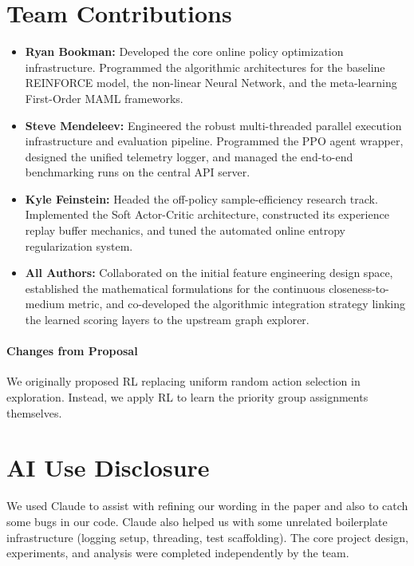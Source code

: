 \documentclass{article}
\begin{document}
\section{Team Contributions}
\begin{itemize}
  \item \textbf{Ryan Bookman:} Developed the core online policy optimization infrastructure. Programmed the algorithmic architectures for the baseline REINFORCE model, the non-linear Neural Network, and the meta-learning First-Order MAML frameworks.
  \item \textbf{Steve Mendeleev:} Engineered the robust multi-threaded parallel execution infrastructure and evaluation pipeline. Programmed the PPO agent wrapper, designed the unified telemetry logger, and managed the end-to-end benchmarking runs on the central API server.
  \item \textbf{Kyle Feinstein:} Headed the off-policy sample-efficiency research track. Implemented the Soft Actor-Critic architecture, constructed its experience replay buffer mechanics, and tuned the automated online entropy regularization system.
  \item \textbf{All Authors:} Collaborated on the initial feature engineering design space, established the mathematical formulations for the continuous closeness-to-medium metric, and co-developed the algorithmic integration strategy linking the learned scoring layers to the upstream graph explorer.
\end{itemize}

\paragraph{Changes from Proposal} We originally proposed RL replacing uniform random action selection in exploration. Instead, we apply RL to learn the priority group assignments themselves.





\appendix



\section{AI Use Disclosure}
We used Claude to assist with refining our wording in the paper and also to catch some bugs in our code. Claude also helped us with some unrelated boilerplate infrastructure (logging setup, threading, test scaffolding). The core project design, experiments, and analysis were completed independently by the team.
\end{document}
